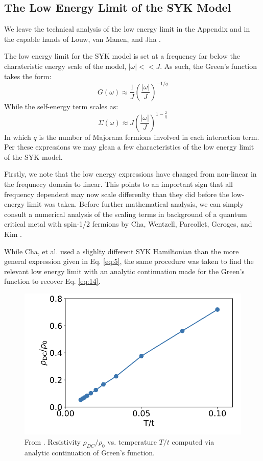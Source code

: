 \documentclass[reprint]{revtex4-2}
\begin{document}
\subsection{The Low Energy Limit of the SYK Model }
We leave the technical analysis of the low energy limit in the Appendix and in the capable hands of Louw, van Manen, and Jha \cite{Louw:2023lpq}. 
\par The low energy limit for the SYK model is set at a frequency far below the charateristic energy scale of the model, $|\omega| << J$. As such, the Green's function takes the form:
\begin{equation}\label{eq:14}
    G(\omega) \approx \frac{1}{J}(\frac{|\omega|}{J})^{-1/q}
\end{equation}
While the self-energy term scales as: 
\begin{equation}
    \Sigma(\omega) \approx J(\frac{|\omega|}{J})^{1-\frac{2}{q}}
\end{equation}
In which $q$ is the number of Majorana fermions involved in each interaction term. Per these expressions we may glean a few characteristics of the low energy limit of the SYK model.
\par Firstly, we note that the low energy expressions have changed from non-linear in the frequnecy domain to linear. This points to an important sign that all frequency dependent may now scale differenlty than they did before the low-energy limit was taken. Before further mathematical analysis, we can simply consult a numerical analysis of the scaling terms in background of a quantum critical metal with spin-1/2 fermions by Cha, Wentzell, Parcollet, Geroges, and Kim \cite{Cha_2020}. 
\par While Cha, et al. used a slighlty different SYK Hamiltonian than the more general expression given in Eq. \ref{eq:5}, the same procedure was taken to find the relevant low energy limit with an analytic continuation made for the Green's function to recover Eq. \ref{eq:14}. 
\begin{figure}[H]
    \centering
    \includegraphics[scale = 0.6]{SYKLinear.png}
    \caption{From \cite{Cha_2020}. Resistivity $\rho_{DC}/\rho_{0}$ vs. temperature $T/t$ computed via analytic continuation of Green's function.}
    \label{fig:4}
\end{figure}
\end{document}
